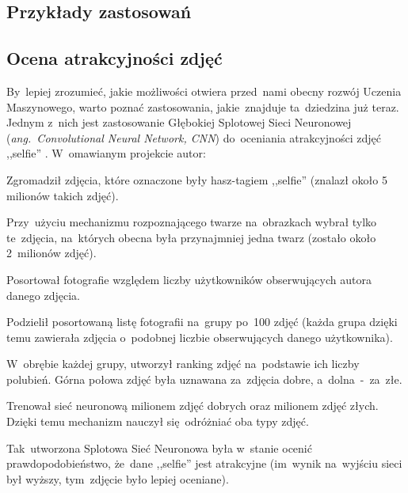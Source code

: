 \documentclass[oneside, 11pt, a4paper]{article}
\begin{document}
\begin{multicols}{2}
\section{Przykłady zastosowań}
\subsection{Ocena atrakcyjności zdjęć}
By~lepiej zrozumieć, jakie możliwości otwiera przed~nami obecny rozwój Uczenia Maszynowego, warto poznać zastosowania, jakie~znajduje ta~dziedzina już teraz. Jednym z~nich jest zastosowanie Głębokiej Splotowej Sieci Neuronowej (\textit{\mbox{ang.~Convolutional} Neural Network, CNN}) do~oceniania atrakcyjności zdjęć ,,selfie'' \cite{SelfieCNN}. W~omawianym projekcie autor:
\begin{compactenum}
	\item Zgromadził zdjęcia, które oznaczone były hasz-tagiem ,,selfie'' (znalazł około 5 milionów takich zdjęć).
	\item Przy~użyciu mechanizmu rozpoznającego twarze na~obrazkach wybrał tylko te~zdjęcia, na~których obecna była przynajmniej jedna twarz (zostało około 2~milionów zdjęć).
	\item Posortował fotografie względem liczby użytkowników obserwujących autora danego zdjęcia.
	\item Podzielił posortowaną listę fotografii na~grupy po~100 zdjęć (każda grupa dzięki temu zawierała zdjęcia o~podobnej liczbie obserwujących danego użytkownika).
	\item W~obrębie każdej grupy, utworzył ranking zdjęć na~podstawie ich liczby polubień. Górna połowa zdjęć była uznawana za~zdjęcia dobre, a~dolna~-~za~złe.
	\item Trenował sieć neuronową milionem zdjęć dobrych oraz milionem zdjęć złych. Dzięki temu mechanizm nauczył się~odróżniać oba typy zdjęć.
\end{compactenum}
Tak~utworzona Splotowa Sieć Neuronowa była w~stanie ocenić prawdopodobieństwo, że~dane ,,selfie'' jest atrakcyjne (im~wynik na~wyjściu sieci był wyższy, tym~zdjęcie było lepiej oceniane).


\end{multicols}
\end{document}
